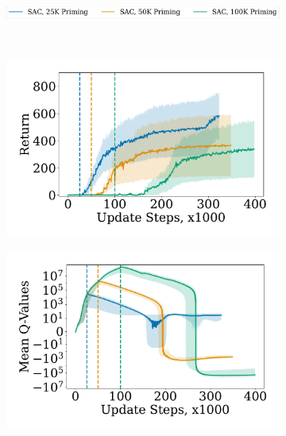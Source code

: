 \begin{figure}[t]
\centering
    \begin{subfigure}[b]{0.8\textwidth}
        \centering
        \includegraphics[height=0.4cm]{figures/dissecting/priming/priming_base_return_legend.pdf}
    \end{subfigure}\\%
    \begin{subfigure}[b]{0.3\textwidth}
        \centering
        \includegraphics[width=\textwidth]{figures/dissecting/priming/priming_base_return.pdf}
    \end{subfigure}
    \hfill
    \begin{subfigure}[b]{0.3\textwidth}
    \centering
        \includegraphics[width=\textwidth]{figures/dissecting/priming/priming_base_Q.pdf}
    \end{subfigure}

\end{figure}
